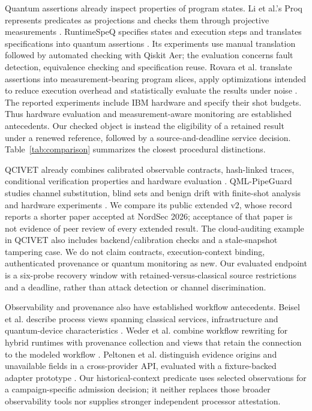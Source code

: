 \documentclass[pdflatex,sn-mathphys-num]{sn-jnl}
\begin{document}
Quantum assertions already inspect properties of program states. Li et al.'s Proq represents predicates as projections and checks them through projective measurements \cite{li2020projection}. RuntimeSpeQ specifies states and execution steps and translates specifications into quantum assertions \cite{runtimespeq}. Its experiments use manual translation followed by automated checking with Qiskit Aer; the evaluation concerns fault detection, equivalence checking and specification reuse. Rovara et al. translate assertions into measurement-bearing program slices, apply optimizations intended to reduce execution overhead and statistically evaluate the results under noise \cite{rovara}. The reported experiments include IBM hardware and specify their shot budgets. Thus hardware evaluation and measurement-aware monitoring are established antecedents. Our checked object is instead the eligibility of a retained result under a renewed reference, followed by a source-and-deadline service decision. Table~\ref{tab:comparison} summarizes the closest procedural distinctions.

QCIVET already combines calibrated observable contracts, hash-linked traces, conditional verification properties and hardware evaluation \cite{yeniaras2026qcivet}. QML-PipeGuard studies channel substitution, blind sets and benign drift with finite-shot analysis and hardware experiments \cite{yeniaras2026pipeguard}. We compare its public extended v2, whose record reports a shorter paper accepted at NordSec 2026; acceptance of that paper is not evidence of peer review of every extended result. The cloud-auditing example in QCIVET also includes backend/calibration checks and a stale-snapshot tampering case. We do not claim contracts, execution-context binding, authenticated provenance or quantum monitoring as new. Our evaluated endpoint is a six-probe recovery window with retained-versus-classical source restrictions and a deadline, rather than attack detection or channel discrimination.

Observability and provenance also have established workflow antecedents. Beisel et al. describe process views spanning classical services, infrastructure and quantum-device characteristics \cite{beisel}. Weder et al. combine workflow rewriting for hybrid runtimes with provenance collection and views that retain the connection to the modeled workflow \cite{weder}. Peltonen et al. distinguish evidence origins and unavailable fields in a cross-provider API, evaluated with a fixture-backed adapter prototype \cite{peltonen2026provenance}. Our historical-context predicate uses selected observations for a campaign-specific admission decision; it neither replaces those broader observability tools nor supplies stronger independent processor attestation.
\end{document}
